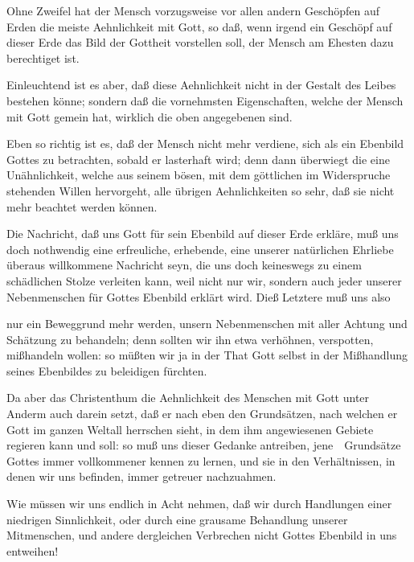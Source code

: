 \begin{aufza}
\item Ohne Zweifel hat der Mensch vorzugsweise vor allen andern Geschöpfen auf Erden die meiste Aehnlichkeit mit Gott, so daß, wenn irgend ein Geschöpf auf dieser Erde das Bild der Gottheit vorstellen soll, der Mensch am Ehesten dazu berechtiget ist.
\item Einleuchtend ist es aber, daß diese Aehnlichkeit nicht in der Gestalt des Leibes bestehen könne; sondern daß die vornehmsten Eigenschaften, welche der Mensch mit Gott gemein hat, wirklich die oben angegebenen sind.
\item Eben so richtig ist es, daß der Mensch nicht mehr verdiene, sich als ein Ebenbild Gottes zu betrachten, sobald er lasterhaft wird; denn dann überwiegt die eine Unähnlichkeit, welche aus seinem bösen, mit dem göttlichen im Widerspruche stehenden Willen hervorgeht, alle übrigen Aehnlichkeiten so sehr, daß sie nicht mehr beachtet werden können.
\end{aufza}

\begin{aufza}
\item Die Nachricht, daß uns Gott für sein Ebenbild auf dieser Erde erkläre, muß uns doch nothwendig eine erfreuliche, erhebende, eine unserer natürlichen Ehrliebe überaus willkommene Nachricht seyn, die uns doch keineswegs zu einem schädlichen Stolze verleiten kann, weil nicht nur wir, sondern auch jeder unserer Nebenmenschen für Gottes Ebenbild erklärt wird. Dieß Letztere muß uns also
\item nur ein Beweggrund mehr werden, unsern Nebenmenschen mit aller Achtung und Schätzung zu behandeln; denn sollten wir ihn etwa verhöhnen, verspotten, mißhandeln wollen: so müßten wir ja in der That Gott selbst in der Mißhandlung seines Ebenbildes zu beleidigen fürchten.
\item Da aber das Christenthum die Aehnlichkeit des Menschen mit Gott unter Anderm auch darein setzt, daß er nach eben den Grundsätzen, nach welchen er Gott im ganzen Weltall herrschen sieht, in dem ihm angewiesenen Gebiete regieren kann und soll: so muß uns dieser Gedanke antreiben, jene~\ Grundsätze Gottes immer vollkommener kennen zu lernen, und sie in den Verhältnissen, in denen wir uns befinden, immer getreuer nachzuahmen.
\item Wie müssen wir uns endlich in Acht nehmen, daß wir durch Handlungen einer niedrigen Sinnlichkeit, oder durch eine grausame Behandlung unserer Mitmenschen, und andere dergleichen Verbrechen nicht Gottes Ebenbild in uns entweihen!
\end{aufza}

